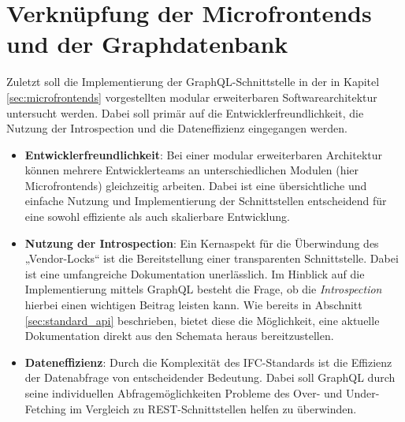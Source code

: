 \section{Verknüpfung der Microfrontends und der Graphdatenbank}
Zuletzt soll die Implementierung der GraphQL-Schnittstelle in der in Kapitel \ref{sec:microfrontends} vorgestellten modular erweiterbaren Softwarearchitektur untersucht werden. Dabei soll primär auf die Entwicklerfreundlichkeit, die Nutzung der Introspection und die Dateneffizienz eingegangen werden.
\begin{itemize}
    \item \textbf{Entwicklerfreundlichkeit}: Bei einer modular erweiterbaren Architektur können mehrere Entwicklerteams an unterschiedlichen Modulen (hier Microfrontends) gleichzeitig arbeiten. Dabei ist eine übersichtliche und einfache Nutzung und Implementierung der Schnittstellen entscheidend für eine sowohl effiziente als auch skalierbare Entwicklung.
    \item \textbf{Nutzung der Introspection}: Ein Kernaspekt für die Überwindung des „Vendor-Locks“ ist die Bereitstellung einer transparenten Schnittstelle. Dabei ist eine umfangreiche Dokumentation unerlässlich. Im Hinblick auf die Implementierung mittels GraphQL besteht die Frage, ob die \textit{Introspection} hierbei einen wichtigen Beitrag leisten kann. Wie bereits in Abschnitt \ref{sec:standard_api} beschrieben, bietet diese die Möglichkeit, eine aktuelle Dokumentation direkt aus den Schemata heraus bereitzustellen.
    \item \textbf{Dateneffizienz}: Durch die Komplexität des IFC-Standards ist die Effizienz der Datenabfrage von entscheidender Bedeutung. Dabei soll GraphQL durch seine individuellen Abfragemöglichkeiten Probleme des Over- und Under-Fetching im Vergleich zu REST-Schnittstellen helfen zu überwinden.
\end{itemize}
